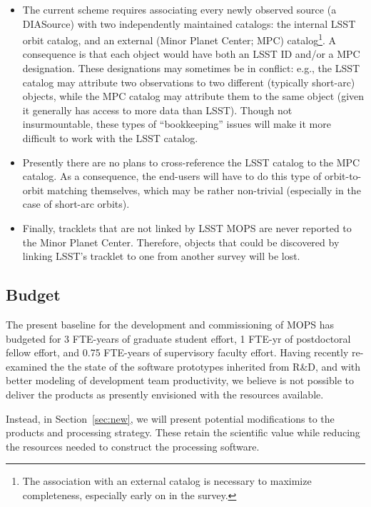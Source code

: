 \documentclass[DM,authoryear,toc,lsstdraft]{lsstdoc}
\begin{document}
\begin{itemize}
	\item The current scheme requires associating every newly observed source (a DIASource) with two independently maintained catalogs: the internal LSST orbit catalog, and an external (Minor Planet Center; MPC) catalog\footnote{The association with an external catalog is necessary to maximize completeness, especially early on in the survey.}. A consequence is that each object would have both an LSST ID and/or a MPC designation. These designations may sometimes be in conflict: e.g., the LSST catalog may attribute two observations to two different (typically short-arc) objects, while the MPC catalog may attribute them to the same object (given it generally has access to more data than LSST). Though not insurmountable, these types of ``bookkeeping'' issues will make it more difficult to work with the LSST catalog.
	\item Presently there are no plans to cross-reference the LSST catalog to the MPC catalog.
As a consequence, the end-users will have to do this type of orbit-to-orbit matching themselves, which may be rather non-trivial (especially in the case of short-arc orbits).
	\item Finally, tracklets that are not linked by LSST MOPS are never reported to the Minor Planet Center. Therefore, objects that could be discovered by linking LSST's tracklet to one from another survey will be lost.
\end{itemize}
	
\subsection{Budget}


The present baseline for the development and commissioning of MOPS has budgeted for 3 FTE-years of graduate student effort, 1 FTE-yr of postdoctoral fellow effort, and 0.75 FTE-years of supervisory faculty effort. Having recently re-examined the the state of the software prototypes inherited from R\&D, and with better modeling of development team productivity, we believe is not possible to deliver the products as presently envisioned with the resources available.

Instead, in Section~\ref{sec:new}, we will present potential modifications to the products and processing strategy. These retain the scientific value while reducing the resources needed to construct the processing software.
\end{document}
